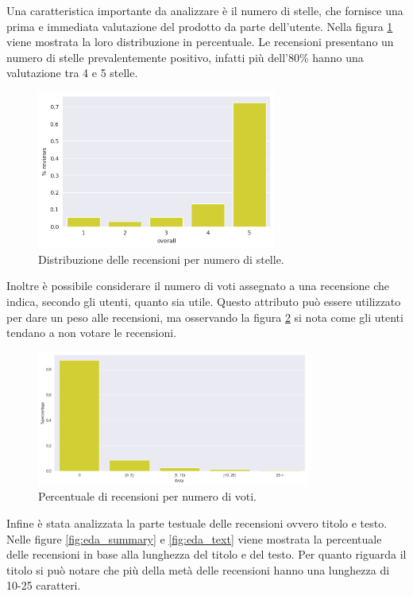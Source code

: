 \newpage

Una caratteristica importante da analizzare è il numero di stelle, che fornisce una prima e immediata valutazione del prodotto da parte dell'utente. Nella figura \ref{fig:eda_overall} viene mostrata la loro distribuzione in percentuale. Le recensioni presentano un numero di stelle prevalentemente positivo, infatti più dell'80\% hanno una valutazione tra 4 e 5 stelle.

\begin{figure}[ht]
    \centering
    \includegraphics[width=0.7\textwidth]{images/eda/eda_overall.png}
    \caption{Distribuzione delle recensioni per numero di stelle.}
    \label{fig:eda_overall}
\end{figure}

Inoltre è possibile considerare il numero di voti assegnato a una recensione che indica, secondo gli utenti, quanto sia utile. Questo attributo può essere utilizzato per dare un peso alle recensioni, ma osservando la figura \ref{fig:eda_vote} si nota come gli utenti tendano a non votare le recensioni.

\begin{figure}[ht]
    \centering
    \includegraphics[width=0.8\textwidth]{images/eda/eda_vote.png}
    \caption{Percentuale di recensioni per numero di voti.}
    \label{fig:eda_vote}
\end{figure}

Infine è stata analizzata la parte testuale delle recensioni ovvero titolo e testo. Nelle figure \ref{fig:eda_summary} e \ref{fig:eda_text} viene mostrata la percentuale delle recensioni in base alla lunghezza del titolo e del testo. Per quanto riguarda il titolo
si può notare che più della metà delle recensioni hanno una lunghezza di 10-25 caratteri.

